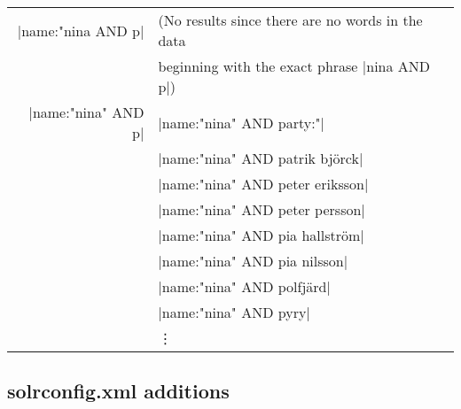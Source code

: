 \begin{tabular}{ r | l}
|name:"nina AND p| & (No results since there are no words in the data \\ & beginning with the exact phrase |nina AND p|) \\
\hline
|name:"nina" AND p| & |name:"nina" AND party:"| \\
                    & |name:"nina" AND patrik björck| \\
                    & |name:"nina" AND peter eriksson| \\
                    & |name:"nina" AND peter persson| \\
                    & |name:"nina" AND pia hallström| \\
                    & |name:"nina" AND pia nilsson| \\
                    & |name:"nina" AND polfjärd| \\
                    & |name:"nina" AND pyry| \\
                    &  \hspace{66pt} \vdots 
\end{tabular}


\newpage

\subsection*{solrconfig.xml additions}

